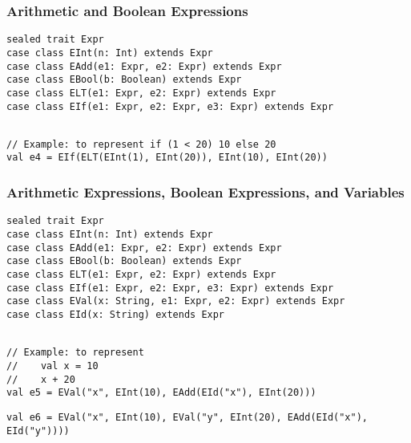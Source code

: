 \documentclass[8pt,pdf]{beamer}
\begin{document}
\begin{frame}[fragile]
\frametitle{Arithmetic and Boolean Expressions}

\begin{lstlisting}
sealed trait Expr
case class EInt(n: Int) extends Expr
case class EAdd(e1: Expr, e2: Expr) extends Expr
case class EBool(b: Boolean) extends Expr
case class ELT(e1: Expr, e2: Expr) extends Expr
case class EIf(e1: Expr, e2: Expr, e3: Expr) extends Expr
\end{lstlisting}
\pause
\begin{lstlisting}

// Example: to represent if (1 < 20) 10 else 20
val e4 = EIf(ELT(EInt(1), EInt(20)), EInt(10), EInt(20))
\end{lstlisting}

\end{frame}

\begin{frame}[fragile]
\frametitle{Arithmetic Expressions, Boolean Expressions, and Variables}

\begin{lstlisting}
sealed trait Expr
case class EInt(n: Int) extends Expr
case class EAdd(e1: Expr, e2: Expr) extends Expr
case class EBool(b: Boolean) extends Expr
case class ELT(e1: Expr, e2: Expr) extends Expr
case class EIf(e1: Expr, e2: Expr, e3: Expr) extends Expr
case class EVal(x: String, e1: Expr, e2: Expr) extends Expr
case class EId(x: String) extends Expr
\end{lstlisting}
\pause
\begin{lstlisting}

// Example: to represent
//    val x = 10
//    x + 20
val e5 = EVal("x", EInt(10), EAdd(EId("x"), EInt(20)))
\end{lstlisting}
\pause

\begin{lstlisting}
val e6 = EVal("x", EInt(10), EVal("y", EInt(20), EAdd(EId("x"), EId("y"))))
\end{lstlisting}


\end{frame}
\end{document}

